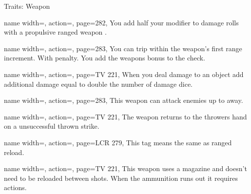 \begin{PageBack}
\begin{Tables}{\backTableHeight}
\begin{Table}{Traits: Weapon}
\begin{entry}{}{%
                name width=\conditionLength,%
                action=\Propulsive,
                page=282,
            }
                You add half your \Strength modifier to damage rolls with a propulsive ranged weapon
                . \hfill {}
            \end{entry}
            \begin{entry}{}{%
                name width=\conditionLength,%
                action=\RangedTrip,
                page=283,
            }
                You can trip within the weapon's first range increment. With  \Cirm penalty. \hfill
                You add the weapons \Item bonus to the check.
            \end{entry}
            \begin{entry}{}{%
                name width=\conditionLength,%
                action=\Razing,
                page=TV 221,
            }
                When you deal damage to an object add additional damage equal to double the number of damage
                dice.
            \end{entry}
            \begin{entry}{}{%
                name width=\conditionLength,%
                action=\Reach,
                page=283,
            }
                This weapon can attack enemies up to  \Feet away. \hfill{}
            \end{entry}
            \begin{entry}{}{%
                name width=\conditionLength,%
                action=\Recovery,
                page=TV 221,
            }
                The weapon returns to the throwers hand on a unsuccessful thrown strike.
            \end{entry}
            \begin{entry}{}{%
                name width=\conditionLength,%
                action=\Reload,
                page=LCR 279,
            }
                This tag means the same as ranged reload.
            \end{entry}
            \begin{entry}{}{%
                name width=\conditionLength,%
                action=\Repeating,
                page=TV 221,
            }
                This weapon uses a magazine and  doesn't need to be reloaded between shots.\hfill
                When the ammunition runs out it requires   actions.
            \end{entry}

\end{Table}
\end{Tables}
\end{PageBack}
